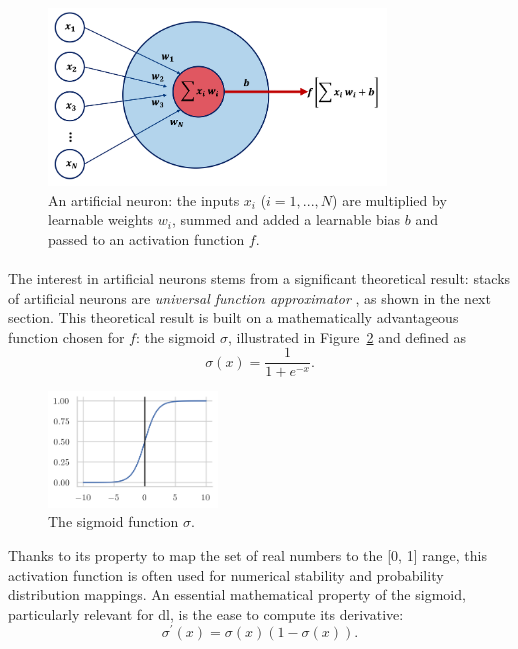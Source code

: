 \begin{figure}[h!]
    \center
    \includegraphics[width=0.8\textwidth]{Images/ML/ann.png}
    \caption{An artificial neuron: the inputs $x_i$ ($i= 1, ..., N$) are multiplied by learnable weights $w_i$, summed and added a learnable bias $b$ and passed to an activation function $f$.} 
    \label{fig:annModel}
\end{figure}

\paragraph{} The interest in artificial neurons stems from a significant theoretical result: stacks of artificial neurons are \textit{universal function approximator} \cite{universalFuncApproxNN,HORNIK1989359}, as shown in the next section. This theoretical result is built on a mathematically advantageous function chosen for $f$: the sigmoid $\sigma$, illustrated in Figure~\ref{fig:sigmoid} and defined as
\begin{equation}\label{eq:sigmoid}
    \sigma(x) = \frac{1}{1 + e^{-x}}.
\end{equation}
\begin{figure}
    \begin{center}
        \includegraphics[width=0.4\textwidth]{Images/ML/sigmoid.png}
        \caption{The sigmoid function $\sigma$.} 
        \label{fig:sigmoid}
    \end{center}
\end{figure}

Thanks to its property to map the set of real numbers to the [0, 1] range, this activation function is often used for numerical stability and probability distribution mappings. An essential mathematical property of the sigmoid, particularly relevant for \gls{dl}, is the ease to compute its derivative: \[\sigma^\prime(x) = \sigma(x) (1- \sigma(x)).\]

